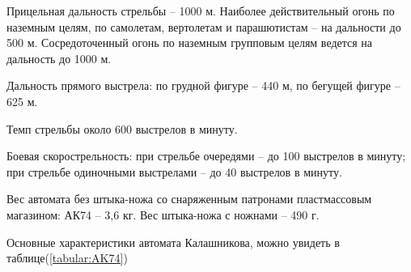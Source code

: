 \documentclass[12pt,a4paper]{report}
\begin{document}
Прицельная дальность стрельбы – 1000 м. Наиболее действительный огонь по наземным целям, по самолетам, вертолетам и парашютистам – на дальности до 500 м. Сосредоточенный огонь по наземным групповым целям ведется на дальность до 1000 м.

Дальность прямого выстрела: по грудной фигуре – 440 м, по бегущей фигуре – 625 м.

Темп стрельбы около 600 выстрелов в минуту.

Боевая скорострельность: при стрельбе очередями – до 100 выстрелов в минуту; при стрельбе одиночными выстрелами – до 40 выстрелов в минуту.

Вес автомата без штыка-ножа со снаряженным патронами пластмассовым магазином: АК74 – 3,6 кг. Вес штыка-ножа с ножнами – 490 г.

Основные характеристики автомата Калашникова, можно увидеть в таблице(\ref{tabular:AK74})
\end{document}
